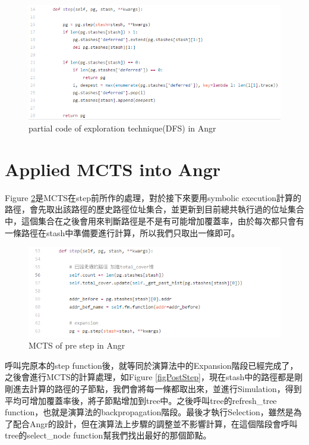 \documentclass[12pt,a4paper,oneside]{book}
\begin{document}
\begin{figure}[htbp]
\center
\includegraphics[]{figures/exptech.png}
\caption{partial code of exploration technique(DFS) in Angr \label{figExptech}}
\end{figure}

\section{Applied MCTS into Angr}

Figure \ref{figPreStep}是MCTS在step前所作的處理，對於接下來要用symbolic execution計算的路徑，會先取出該路徑的歷史路徑位址集合，並更新到目前總共執行過的位址集合中，這個集合在之後會用來判斷路徑是不是有可能增加覆蓋率，由於每次都只會有一條路徑在stash中準備要進行計算，所以我們只取出一條即可。

\begin{figure}[htbp]
\center
\includegraphics[]{figures/preStep.png}
\caption{MCTS of pre step in Angr \label{figPreStep}}
\end{figure}

呼叫完原本的step function後，就等同於演算法中的Expansion階段已經完成了，之後會進行MCTS的計算處理，如Figure \ref{figPostStep}，現在stash中的路徑都是剛剛進去計算的路徑的子節點，我們會將每一條都取出來，並進行Simulation，得到平均可增加覆蓋率後，將子節點增加到tree中。之後呼叫tree的refresh\_tree function，也就是演算法的backpropagation階段。最後才執行Selection，雖然是為了配合Angr的設計，但在演算法上步驟的調整並不影響計算，在這個階段會呼叫tree的select\_node function幫我們找出最好的那個節點。
\end{document}
